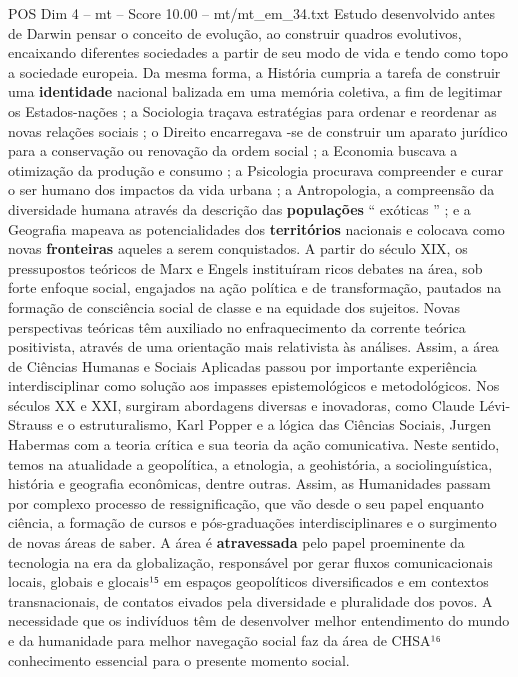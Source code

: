 \begin{textsample}{POS Dim 4 – mt – Score 10.00 – mt/mt\_em\_34.txt}
Estudo desenvolvido antes de Darwin pensar o conceito de evolução, ao construir quadros evolutivos, encaixando diferentes sociedades a partir de seu modo de vida e tendo como topo a sociedade europeia.
Da mesma forma, a História cumpria a tarefa de construir uma \textbf{identidade} nacional balizada em uma memória coletiva, a fim de legitimar os Estados-nações ; a Sociologia traçava estratégias para ordenar e reordenar as novas relações sociais ; o Direito encarregava -se de construir um aparato jurídico para a conservação ou renovação da ordem social ; a Economia buscava a otimização da produção e consumo ; a Psicologia procurava compreender e curar o ser humano dos impactos da vida urbana ; a Antropologia, a compreensão da diversidade humana através da descrição das \textbf{populações} “ exóticas ” ; e a Geografia mapeava as potencialidades dos \textbf{territórios} nacionais e colocava como novas \textbf{fronteiras} aqueles a serem conquistados.
A partir do século XIX, os pressupostos teóricos de Marx e Engels instituíram ricos debates na área, sob forte enfoque social, engajados na ação política e de transformação, pautados na formação de consciência social de classe e na equidade dos sujeitos.
Novas perspectivas teóricas têm auxiliado no enfraquecimento da corrente teórica positivista, através de uma orientação mais relativista às análises.
Assim, a área de Ciências Humanas e Sociais Aplicadas passou por importante experiência interdisciplinar como solução aos impasses epistemológicos e metodológicos.
Nos séculos XX e XXI, surgiram abordagens diversas e inovadoras, como Claude Lévi-Strauss e o estruturalismo, Karl Popper e a lógica das Ciências Sociais, Jurgen Habermas com a teoria crítica e sua teoria da ação comunicativa.
Neste sentido, temos na atualidade a geopolítica, a etnologia, a geohistória, a sociolinguística, história e geografia econômicas, dentre outras.
Assim, as Humanidades passam por complexo processo de ressignificação, que vão desde o seu papel enquanto ciência, a formação de cursos e pós-graduações interdisciplinares e o surgimento de novas áreas de saber.
A área é \textbf{atravessada} pelo papel proeminente da tecnologia na era da globalização, responsável por gerar fluxos comunicacionais locais, globais e glocais¹⁵ em espaços geopolíticos diversificados e em contextos transnacionais, de contatos eivados pela diversidade e pluralidade dos povos.
A necessidade que os indivíduos têm de desenvolver melhor entendimento do mundo e da humanidade para melhor navegação social faz da área de CHSA¹⁶ conhecimento essencial para o presente momento social.

\end{textsample}
